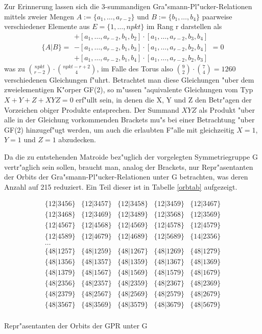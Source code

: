 Zur Erinnerung lassen sich die 3-summandigen Gra"smann-Pl"ucker-Relationen
mittels zweier Mengen $A:=\{a_1,\ldots,a_{r-2}\}$ und $B:=\{b_1,\ldots,b_4\}$
paarweise verschiedener Elemente aus $E=\{1,\ldots,npkt\}$ im Rang r
darstellen als
$$\{A|B\}=
  \begin{array}{l}
    +[a_1,\ldots,a_{r-2},b_1,b_2]\cdot [a_1,\ldots,a_{r-2},b_3,b_4]\\
    -[a_1,\ldots,a_{r-2},b_1,b_3]\cdot [a_1,\ldots,a_{r-2},b_2,b_4]\\
    +[a_1,\ldots,a_{r-2},b_1,b_4]\cdot [a_1,\ldots,a_{r-2},b_2,b_3]
  \end{array}=0$$
was zu ${npkt \choose r-2}\cdot{npkt-r+2 \choose 4}$, im Falle des Torus also
${9\choose 2}\cdot{7\choose 4}=1260$ verschiedenen Gleichungen f"uhrt.
Betrachtet man diese Gleichungen "uber dem zweielementigen K"orper GF(2), so
m"ussen "aquivalente Gleichungen vom Typ $X + Y + Z + XYZ = 0$ erf"ullt sein, in
denen die X, Y und Z den Betr"agen der Vorzeichen obiger Produkte entsprechen.
Der Summand $XYZ$ als Produkt "uber alle in der Gleichung vorkommenden Brackets
mu"s bei einer Betrachtung "uber GF(2) hinzugef"ugt werden, um auch die
erlaubten F"alle mit gleichzeitig $X=1$, $Y=1$ und $Z=1$ abzudecken.

Da die zu entstehenden Matroide bez"uglich der vorgelegten Symmetriegruppe G
vertr"aglich sein sollen, braucht man, analog der Brackets, nur Repr"asentanten
der Orbits der Gra"smann-Pl"ucker-Relationen unter G betrachten, was deren
Anzahl auf 215 reduziert. Ein Teil dieser ist in Tabelle \ref{orbtab}
aufgezeigt.

\begin{table}[htb]
{\small
$$
\begin{array}{ccccc}
\{12|3456\} & \{12|3457\} & \{12|3458\} & \{12|3459\} & \{12|3467\} \\
\{12|3468\} & \{12|3469\} & \{12|3489\} & \{12|3568\} & \{12|3569\} \\
\{12|4567\} & \{12|4568\} & \{12|4569\} & \{12|4578\} & \{12|4579\} \\
\{12|4589\} & \{12|4679\} & \{12|4689\} & \{12|5689\} & \{14|2356\} \\
\ldots      &             &             &             &             \\
\{48|1257\} & \{48|1259\} & \{48|1267\} & \{48|1269\} & \{48|1279\} \\
\{48|1356\} & \{48|1357\} & \{48|1359\} & \{48|1367\} & \{48|1369\} \\
\{48|1379\} & \{48|1567\} & \{48|1569\} & \{48|1579\} & \{48|1679\} \\
\{48|2356\} & \{48|2357\} & \{48|2359\} & \{48|2367\} & \{48|2369\} \\
\{48|2379\} & \{48|2567\} & \{48|2569\} & \{48|2579\} & \{48|2679\} \\
\{48|3567\} & \{48|3569\} & \{48|3579\} & \{48|3679\} & \{48|5679\} \\
\end{array}$$}
\caption{Repr"asentanten der Orbits der GPR unter G}
\label{orbtab}
\end{table}

